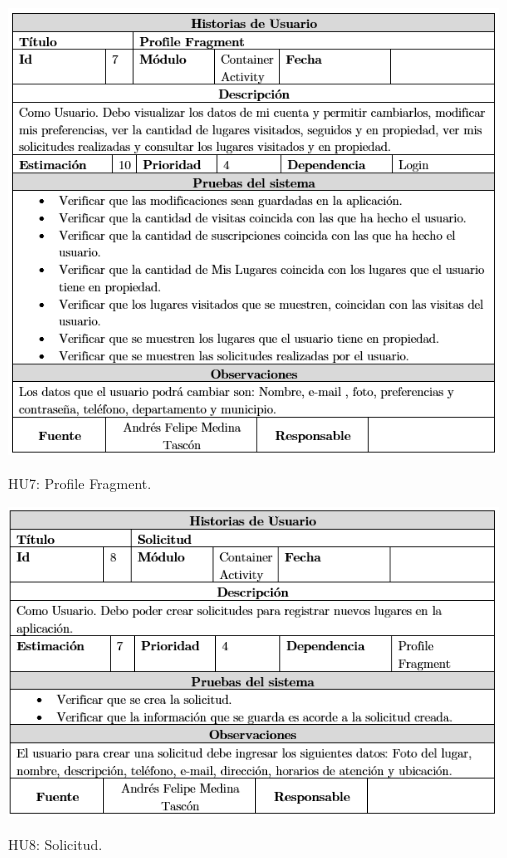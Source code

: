 \documentclass[12pt,letterpaper,openany]{book}
\begin{document}
\begin{table}[H]
\centering
\includegraphics[width=13cm]{./imagenes/HU/HU7}
\caption{HU7: Profile Fragment.}
\end{table}

\begin{table}[H]
\centering
\includegraphics[width=13cm]{./imagenes/HU/HU8}
\caption{HU8: Solicitud.}
\end{table}
\end{document}

